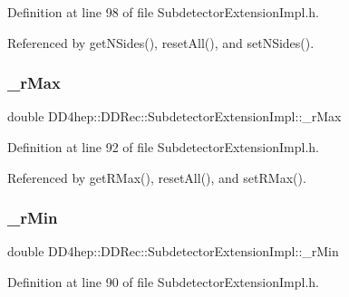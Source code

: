 Definition at line 98 of file Subdetector\+Extension\+Impl.\+h.



Referenced by get\+N\+Sides(), reset\+All(), and set\+N\+Sides().

\hypertarget{class_d_d4hep_1_1_d_d_rec_1_1_subdetector_extension_impl_ac9a17365ea087ce3a3b9dbec6b514f14}{}\label{class_d_d4hep_1_1_d_d_rec_1_1_subdetector_extension_impl_ac9a17365ea087ce3a3b9dbec6b514f14} 
\subsubsection{\texorpdfstring{\+\_\+r\+Max}{\_rMax}}
{\footnotesize\ttfamily double D\+D4hep\+::\+D\+D\+Rec\+::\+Subdetector\+Extension\+Impl\+::\+\_\+r\+Max\hspace{0.3cm}{\ttfamily [protected]}}



Definition at line 92 of file Subdetector\+Extension\+Impl.\+h.



Referenced by get\+R\+Max(), reset\+All(), and set\+R\+Max().

\hypertarget{class_d_d4hep_1_1_d_d_rec_1_1_subdetector_extension_impl_a01b803bfceeeff565ed7728e6292ecb6}{}\label{class_d_d4hep_1_1_d_d_rec_1_1_subdetector_extension_impl_a01b803bfceeeff565ed7728e6292ecb6} 
\subsubsection{\texorpdfstring{\+\_\+r\+Min}{\_rMin}}
{\footnotesize\ttfamily double D\+D4hep\+::\+D\+D\+Rec\+::\+Subdetector\+Extension\+Impl\+::\+\_\+r\+Min\hspace{0.3cm}{\ttfamily [protected]}}



Definition at line 90 of file Subdetector\+Extension\+Impl.\+h.



